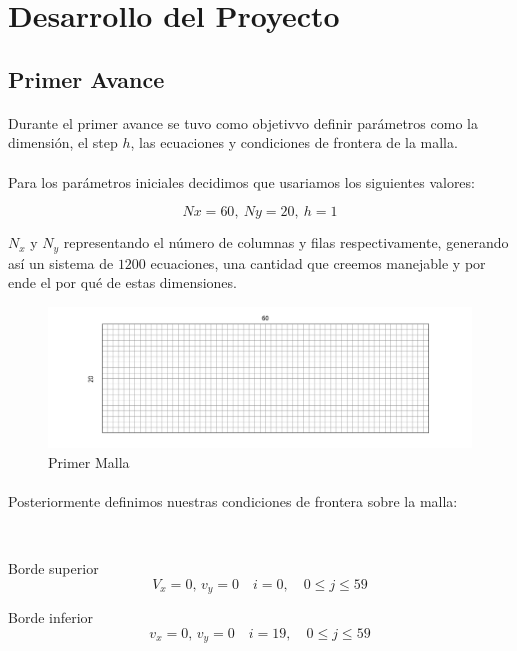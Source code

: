 \documentclass{article}
\begin{document}
  \section*{Desarrollo del Proyecto}

  \subsection*{Primer Avance}
  \paragraph{}
  Durante el primer avance se tuvo como objetivvo definir parámetros como la dimensión, el step $h$, las ecuaciones y condiciones de frontera de la malla.

  \paragraph{}
  Para los parámetros iniciales decidimos que usariamos los siguientes valores:

  \[Nx=60, \ Ny=20, \ h=1\]

  $N_x$ y $N_y$ representando el número de columnas y filas respectivamente, generando así un sistema de $1200$ ecuaciones, una cantidad que creemos manejable y por ende el por qué de estas dimensiones.

  \begin{figure}[h!]
    \centering
    \includegraphics[width=1\textwidth]{PrimerMalla.png}
    \caption{Primer Malla}
  \end{figure}

  \paragraph{}
  Posteriormente definimos nuestras condiciones de frontera sobre la malla:

  \

  Borde superior
  \[V_x = 0, \, v_y = 0 \quad i = 0, \quad 0 \leq j \leq 59\]

  Borde inferior
  \[v_x = 0, \, v_y = 0 \quad i = 19, \quad 0 \leq j \leq 59\]
\end{document}

